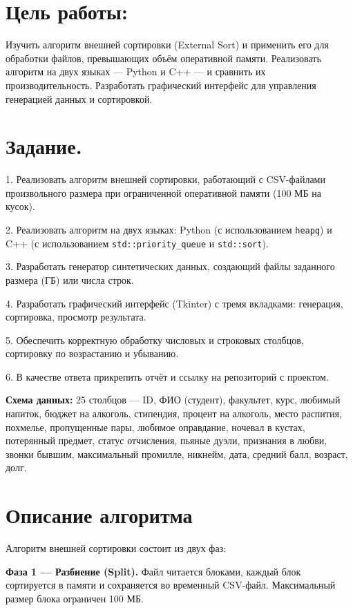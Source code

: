 \documentclass[oneside,a4paper,14pt]{extarticle}
\begin{document}
\begin{flushleft}
\section*{Цель работы:}
\noindent Изучить алгоритм внешней сортировки (External Sort) и применить его для обработки файлов, превышающих объём оперативной памяти. Реализовать алгоритм на двух языках --- Python и C++ --- и сравнить их производительность. Разработать графический интерфейс для управления генерацией данных и сортировкой.

\section*{Задание.}

1. Реализовать алгоритм внешней сортировки, работающий с CSV-файлами произвольного размера при ограниченной оперативной памяти (100 МБ на кусок).

2. Реализовать алгоритм на двух языках: Python (с использованием \texttt{heapq}) и C++ (с использованием \texttt{std::priority\_queue} и \texttt{std::sort}).

3. Разработать генератор синтетических данных, создающий файлы заданного размера (ГБ) или числа строк.

4. Разработать графический интерфейс (Tkinter) с тремя вкладками: генерация, сортировка, просмотр результата.

5. Обеспечить корректную обработку числовых и строковых столбцов, сортировку по возрастанию и убыванию.

6. В качестве ответа прикрепить отчёт и ссылку на репозиторий с проектом.

\textbf{Схема данных:} 25 столбцов --- ID, ФИО (студент), факультет, курс, любимый напиток, бюджет на алкоголь, стипендия, процент на алкоголь, место распития, похмелье, пропущенные пары, любимое оправдание, ночевал в кустах, потерянный предмет, статус отчисления, пьяные дуэли, признания в любви, звонки бывшим, максимальный промилле, никнейм, дата, средний балл, возраст, долг.

\section*{Описание алгоритма}

Алгоритм внешней сортировки состоит из двух фаз:

\textbf{Фаза 1 --- Разбиение (Split).} Файл читается блоками, каждый блок сортируется в памяти и сохраняется во временный CSV-файл. Максимальный размер блока ограничен 100 МБ.


\end{flushleft}
\end{document}
